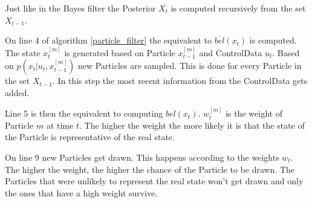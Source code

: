 Just like in the Bayes filter the \gls{Posterior} $X_t$ is computed recursively from the set $X_{t-1}$. 

On line 4 of algorithm \ref{particle_filter} the equivalent to $\overline{bel}(x_t)$ is computed. The state $x_t^{[m]}$ is generated based on \gls{Particle} $x_{t-1}^{[m]}$ and \gls{ControlData} $u_t$. Based on $p(x_t|u_t,x_{t-1}^{[m]})$ new \gls{Particle}s are sampled. This is done for every \gls{Particle} in the set $X_{t-1}$. In this step the most recent information from the \gls{ControlData} gets added.

Line 5 is then the equivalent to computing $bel(x_t)$. $w_t^{[m]}$ is the weight of \gls{Particle} $m$ at time $t$. The higher the weight the more likely it is that the state of the \gls{Particle} is representative of the real state. 

On line 9 new \gls{Particle}s get drawn. This happens according to the weights $w_t$. The higher the weight, the higher the chance of the \gls{Particle} to be drawn. The \gls{Particle}s that were unlikely to represent the real state won't get drawn and only the ones that have a high weight survive.





